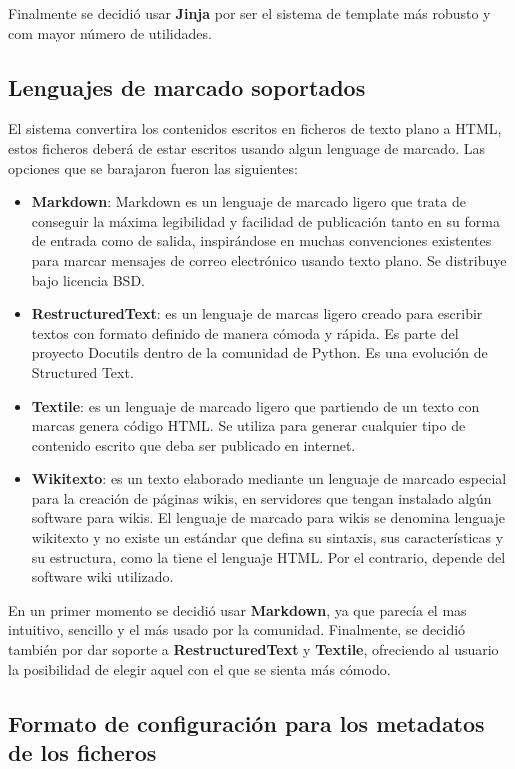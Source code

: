 Finalmente se decidió usar \textbf{Jinja} por ser el sistema de template más robusto y com mayor número de utilidades.

\subsection{Lenguajes de marcado soportados}

El sistema convertira los contenidos escritos en ficheros de texto plano a HTML, estos ficheros deberá de estar escritos
usando algun lenguage de marcado. Las opciones que se barajaron fueron las siguientes:

\begin{itemize}
\item \textbf{Markdown}: Markdown es un lenguaje de marcado ligero que trata de conseguir la máxima legibilidad y facilidad
de publicación tanto en su forma de entrada como de salida, inspirándose en muchas convenciones existentes para marcar mensajes
de correo electrónico usando texto plano. Se distribuye bajo licencia BSD.
\item \textbf{RestructuredText}: es un lenguaje de marcas ligero creado para escribir textos con formato definido de manera cómoda
y rápida. Es parte del proyecto Docutils dentro de la comunidad de Python. Es una evolución de Structured Text.
\item \textbf{Textile}: es un lenguaje de marcado ligero que partiendo de un texto con marcas genera código HTML.
Se utiliza para generar cualquier tipo de contenido escrito que deba ser publicado en internet.
\item \textbf{Wikitexto}: es un texto elaborado mediante un lenguaje de marcado especial para la creación de páginas wikis,
en servidores que tengan instalado algún software para wikis. El lenguaje de marcado para wikis se denomina lenguaje wikitexto
y no existe un estándar que defina su sintaxis, sus características y su estructura, como la tiene el lenguaje HTML. Por el
contrario, depende del software wiki utilizado.
\end{itemize}

En un primer momento se decidió usar \textbf{Markdown}, ya que parecía el mas intuitivo, sencillo y el más usado por la comunidad. Finalmente,
se decidió también por dar soporte a \textbf{RestructuredText} y \textbf{Textile}, ofreciendo al usuario la posibilidad de elegir aquel
con el que se sienta más cómodo.

\subsection{Formato de configuración para los metadatos de los ficheros}

